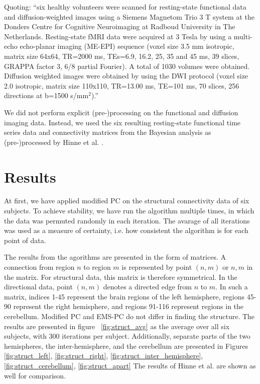 \documentclass[a4paper, 10pt, english, onecolumn]{article}
\begin{document}
Quoting: ``six healthy volunteers were scanned for resting-state functional data and diffusion-weighted images using a Siemens Magnetom Trio 3 T system at the Donders Centre for Cognitive Neuroimaging at Radboud University in The Netherlands.
Resting-state fMRI data were acquired at 3 Tesla by using a multi-echo echo-planar imaging (ME-EPI) sequence (voxel size 3.5 mm isotropic, matrix size 64x64, TR=2000 ms, TEs=6.9, 16.2, 25, 35 and 45 ms, 39 slices, GRAPPA factor 3, 6/8 partial Fourier).
A total of 1030 volumes were obtained.
Diffusion weighted images were obtained by using the DWI protocol (voxel size 2.0 isotropic, matrix size 110x110, TR=13.00 ms, TE=101 ms, 70 slices, 256 directions at b=1500 s/mm$^2$).''

We did not perform explicit (pre-)processing on the functional and diffusion imaging data.
Instead, we used the six resulting resting-state functional time series data and connectivity matrices from the Bayesian analysis as (pre-)processed by Hinne et al. \cite{hinne2013}.

\section{Results}
At first, we have applied modified PC on the structural connectivity data of six subjects.
To achieve stability, we have run the algorithm multiple times, in which the data was permuted randomly in each iteration.
The avarage of all iterations was used as a measure of certainty, i.e. how consistent the algorithm is for each point of data.

The results from the agorithms are presented in the form of matrices.
A connection from region $n$ to region $m$ is represented by point $(n,m)$ or $n,m$ in the matrix.
For structural data, this matrix is therefore symmetrical.
In the directional data, point $(n,m)$ denotes a directed edge from $n$ to $m$.
In such a matrix, indices 1-45 represent the brain regions of the left hemisphere, regions 45-90 represent the right hemisphere, and regions 91-116 represent regions in the cerebellum. %
Modified PC and EMS-PC do not differ in finding the structure.
The results are presented in figure ~\ref{fig:struct_avg} as the average over all six subjects, with 300 iterations per subject. Additionally, separate parts of the two hemispheres, the inter-hemisphere, and the cerebellum are presented in Figures \ref{fig:struct_left}, \ref{fig:struct_right}, \ref{fig:struct_inter_hemisphere}, \ref{fig:struct_cerebellum}, \ref{fig:struct_apart}
The results of Hinne et al. are shown as well for comparison.
\end{document}
